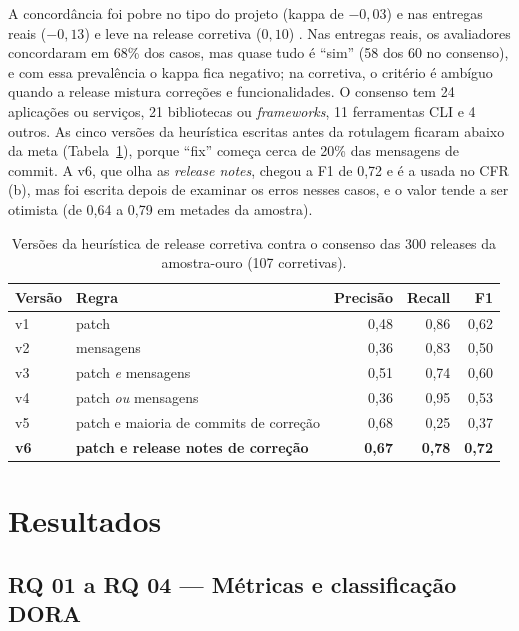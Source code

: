 \documentclass[12pt]{article}
\begin{document}
A concordância foi pobre no tipo do projeto (kappa de $-0{,}03$) e nas entregas
reais ($-0{,}13$) e leve na release corretiva ($0{,}10$) \cite{landis1977}. Nas
entregas reais, os avaliadores concordaram em 68\% dos casos, mas quase tudo é
``sim'' (58 dos 60 no consenso), e com essa prevalência o kappa fica negativo;
na corretiva, o critério é ambíguo quando a release mistura correções e
funcionalidades. O consenso tem 24 aplicações ou serviços, 21 bibliotecas ou
\emph{frameworks}, 11 ferramentas CLI e 4 outros. As cinco versões da heurística escritas antes da rotulagem ficaram
abaixo da meta (Tabela~\ref{tab:heuristica}), porque ``fix'' começa cerca de
20\% das mensagens de commit. A v6, que olha as \emph{release notes}, chegou a
F1 de 0,72 e é a usada no CFR (b), mas foi escrita depois de examinar os erros
nesses casos, e o valor tende a ser otimista (de 0,64 a 0,79 em metades da
amostra).

\begin{table}[t]
  \centering
  \caption{Versões da heurística de release corretiva contra o consenso das 300
    releases da amostra-ouro (107 corretivas).}
  \label{tab:heuristica}
  \footnotesize
  \begin{tabular}{@{}llrrr@{}}
    \toprule
    Versão & Regra & Precisão & Recall & F1 \\
    \midrule
    v1 & patch & 0,48 & 0,86 & 0,62 \\
    v2 & mensagens & 0,36 & 0,83 & 0,50 \\
    v3 & patch \emph{e} mensagens & 0,51 & 0,74 & 0,60 \\
    v4 & patch \emph{ou} mensagens & 0,36 & 0,95 & 0,53 \\
    v5 & patch e maioria de commits de correção & 0,68 & 0,25 & 0,37 \\
    \textbf{v6} & \textbf{patch e release notes de correção} & \textbf{0,67} & \textbf{0,78} & \textbf{0,72} \\
    \bottomrule
  \end{tabular}
\end{table}

\section{Resultados}
\label{sec:resultados}

\subsection{RQ 01 a RQ 04 --- Métricas e classificação DORA}
\label{sec:rq01-04}
\end{document}
